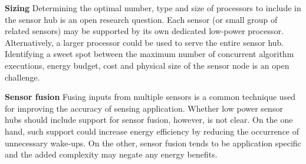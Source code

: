 {\bf Sizing} Determining the optimal number, type and size of
processors to include in the sensor hub is an open research question.
Each sensor (or small group of related sensors) may be supported by
its own dedicated low-power processor.  Alternatively, a larger
processor could be used to serve the entire sensor hub.  Identifying a
sweet spot between the maximum number of concurrent algorithm
executions, energy budget, cost and physical size of the sensor node
is an open challenge.

{\bf Sensor fusion} Fusing inputs from multiple sensors is a common
technique used for improving the accuracy of sensing application.
Whether low power sensor hubs should include support for sensor
fusion, however, is not clear.  On the one hand, such support could
increase energy efficiency by reducing the occurrence of unnecessary
wake-ups.  On the other, sensor fusion tends to be application specific
and the added complexity may negate any energy benefits.

